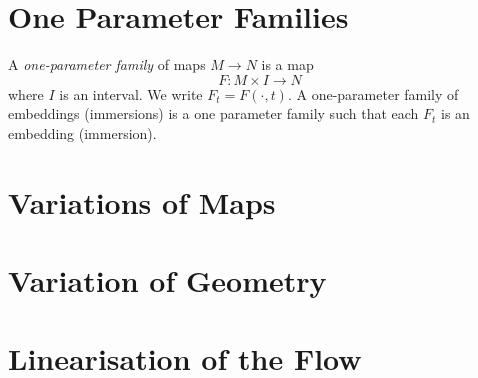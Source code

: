 \section{One Parameter Families}

\begin{defn}
A \emph{one-parameter family} of maps \(M \to N\) is a map
\[
F : M \times I \to N
\]
where \(I\) is an interval. We write \(F_t = F(\cdot, t)\). A one-parameter family of embeddings (immersions) is a one parameter family such that each \(F_t\) is an embedding (immersion).
\end{defn}

\section{Variations of Maps}

\section{Variation of Geometry}

\section{Linearisation of the Flow}
